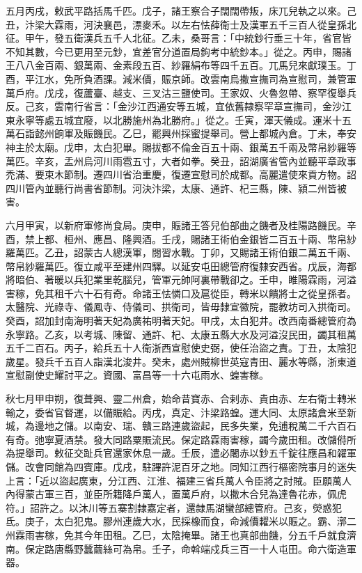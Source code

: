 \begin{pinyinscope}
 五月丙戌，敕武平路括馬千匹。戊子，諸王察合子闊闊帶叛，床兀兒執之以來。己丑，汴梁大霖雨，河決襄邑，漂麥禾。以左右怯薛衛士及漢軍五千三百人從皇孫北征。甲午，發五衛漢兵五千人北征。乙未，桑哥言：「中統鈔行垂三十年，省官皆不知其數，今已更用至元鈔，宜差官分道置局鉤考中統鈔本。」從之。丙申，賜諸王八八金百兩、銀萬兩、金素段五百、紗羅絹布等四千五百。兀馬兒來獻璞玉。丁酉，平江水，免所負酒課。減米價，賑京師。改雲南烏撒宣撫司為宣慰司，兼管軍萬戶府。戊戌，復蘆臺、越支、三叉沽三鹽使司。王家奴、火魯忽帶、察罕復舉兵反。己亥，雲南行省言：「金沙江西通安等五城，宜依舊隸察罕章宣撫司，金沙江東永寧等處五城宜廢，以北勝施州為北勝府。」從之。壬寅，渾天儀成。運米十五萬石詣懿州餉軍及賑饑民。乙巳，罷興州採蜜提舉司。營上都城內倉。丁未，奉安神主於太廟。戊申，太白犯畢。賜拔都不倫金百五十兩、銀萬五千兩及幣帛紗羅等萬匹。辛亥，盂州烏河川雨雹五寸，大者如拳。癸丑，詔湖廣省管內並聽平章政事禿滿、要束木節制。遷四川省治重慶，復遷宣慰司於成都。高麗遣使來貢方物。詔四川管內並聽行尚書省節制。河決汴梁，太康、通許、杞三縣，陳、潁二州皆被害。



 六月甲寅，以新府軍修尚食局。庚申，賑諸王答兒伯部曲之饑者及桂陽路饑民。辛酉，禁上都、桓州、應昌、隆興酒。壬戌，賜諸王術伯金銀皆二百五十兩、幣帛紗羅萬匹。乙丑，詔蒙古人總漢軍，閱習水戰。丁卯，又賜諸王術伯銀二萬五千兩、幣帛紗羅萬匹。復立咸平至建州四驛。以延安屯田總管府復隸安西省。戊辰，海都將暗伯、著暖以兵犯業里乾腦兒，管軍元帥阿裏帶戰卻之。壬申，睢陽霖雨，河溢害稼，免其租千六十石有奇。命諸王怯憐口及扈從臣，轉米以饋將士之從皇孫者。太醫院、光祿寺、儀鳳寺、侍儀司、拱衛司，皆毋隸宣徽院，罷教坊司入拱衛司。癸酉，詔加封南海明著天妃為廣祐明著天妃。甲戌，太白犯井。改西南番總管府為永寧路。乙亥，以考城、陳留、通許、杞、太康五縣大水及河溢沒民田，蠲其租萬五千二百石。丙子，給兵五十人衛浙西宣慰使史弼，使任治盜之責。丁丑，太陰犯歲星。發兵千五百人詣漢北浚井。癸未，處州賊柳世英寇青田、麗水等縣，浙東道宣慰副使史耀討平之。資國、富昌等一十六屯雨水、蝗害稼。



 秋七月甲申朔，復葺興、靈二州倉，始命昔寶赤、合剌赤、貴由赤、左右衛士轉米輸之，委省官督運，以備賑給。丙戌，真定、汴梁路蝗。運大同、太原諸倉米至新城，為邊地之儲。以南安、瑞、贛三路連歲盜起，民多失業，免逋稅萬二千六百石有奇。弛寧夏酒禁。發大同路粟賑流民。保定路霖雨害稼，蠲今歲田租。改儲偫所為提舉司。敕征交趾兵官還家休息一歲。壬辰，遣必闍赤以鈔五千錠往應昌和糴軍儲。改會同館為四賓庫。戊戌，駐蹕許泥百牙之地。同知江西行樞密院事月的迷失上言：「近以盜起廣東，分江西、江淮、福建三省兵萬人令臣將之討賊。臣願萬人內得蒙古軍三百，並臣所籍降戶萬人，置萬戶府，以撒木合兒為達魯花赤，佩虎符。」詔許之。以沐川等五寨割隸嘉定者，還隸馬湖蠻部總管府。己亥，熒惑犯氐。庚子，太白犯鬼。膠州連歲大水，民採橡而食，命減價糶米以賑之。霸、漷二州霖雨害稼，免其今年田租。乙巳，太陰掩畢。諸王也真部曲饑，分五千戶就食濟南。保定路唐縣野蠶繭絲可為帛。壬子，命斡端戍兵三百一十人屯田。命六衛造軍器。




\end{pinyinscope}
